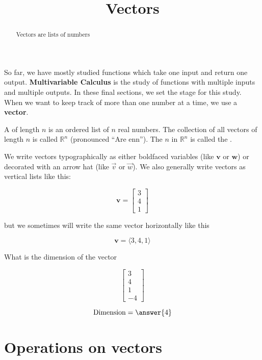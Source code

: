 \documentclass{ximera}
\title[Dig-In:]{Vectors}
\begin{document}
\begin{abstract}
  Vectors are lists of numbers
\end{abstract}
\maketitle

So far, we have mostly studied functions which take one input and return one output.  \textbf{Multivariable Calculus} is the study of functions with multiple inputs and multiple outputs.  In these final sections, we set the stage for this study.  When we want to keep track of more than one number at a time, we use a \textbf{vector}.

\begin{definition}
	A  of length $n$ is an ordered list of $n$ real numbers.  The collection of all vectors of length $n$ is called $\mathbb{R}^n$ (pronounced ``Are enn'').  The $n$ in $\mathbb{R}^n$ is called the .
\end{definition}

We write vectors typographically as either boldfaced variables (like $\mathbf{v}$ or $\mathbf{w}$) or decorated with an arrow hat (like $\vec{v}$ or $\vec{w}$).  We also generally write vectors as vertical lists like this:

\[
\mathbf{v} = \begin{bmatrix} 3 \\ 4 \\1 \end{bmatrix}
\]

but we sometimes will write the same vector horizontally like this

\[
\mathbf{v} = \langle 3, 4, 1 \rangle
\]

\begin{question}
	What is the dimension of the vector 
	
	\[
	\begin{bmatrix} 3 \\ 4 \\1 \\ -4 \end{bmatrix}
	\]
	
	\[
	\textrm{Dimension} = \answer{4}
	\]
\end{question}

\section{Operations on vectors}
\end{document}
